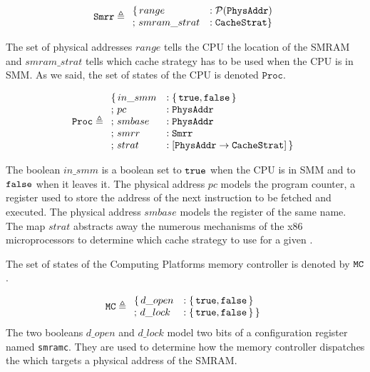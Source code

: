 \[ \texttt{Smrr} \triangleq \begin{array}{ll}
                              \{\,range &: \mathcal{P}(\texttt{PhysAddr}) \\
                               ;\,smram\_strat &: \texttt{CacheStrat} \}
\end{array} \]

The set of physical addresses $range$ tells the CPU the location of the SMRAM
and $smram\_strat$ tells which cache strategy has to be used when the CPU is in
SMM. As we said, the set of states of the CPU is denoted $\texttt{Proc}$.

\[ \texttt{Proc} \triangleq \begin{array}{ll}
                              \{\,in\_smm &: \{\,\mathtt{true},
                              \mathtt{false}\,\} \\
                              ;\,pc &: \texttt{PhysAddr} \\
                              ;\,smbase &: \texttt{PhysAddr} \\
                              ;\,smrr &: \texttt{Smrr} \\
                              ;\,strat &: [ \texttt{PhysAddr} \rightarrow
                              \texttt{CacheStrat}]\,\}
                            \end{array} \]

The boolean $in\_smm$ is a boolean set to $\mathtt{true}$ when the CPU is in
SMM and to $\mathtt{false}$ when it leaves it. The physical address $pc$ models the
program counter, a register used to store the address of the next instruction to
be fetched and executed. The physical address $smbase$ models the register of
the same name. The map $strat$ abstracts away the numerous mechanisms of the x86
microprocessors to determine which cache strategy to use for a given \IO.

The set of states of the  Computing Platforms memory
controller is denoted by $\mathtt{MC}$.

\[ \texttt{MC} \triangleq \begin{array}{ll}
                              \{\,d\_open &: \{\,\mathtt{true},
                              \mathtt{false}\,\} \\
                              ;\,d\_lock &: \{\,\mathtt{true},
                          \mathtt{false}\,\}\,\}
                            \end{array} \]
The two booleans $d\_open$ and $d\_lock$ model two bits of a configuration
register named \texttt{smramc}. They are used to determine how the memory
controller dispatches the \IO which targets a physical address of the SMRAM.

